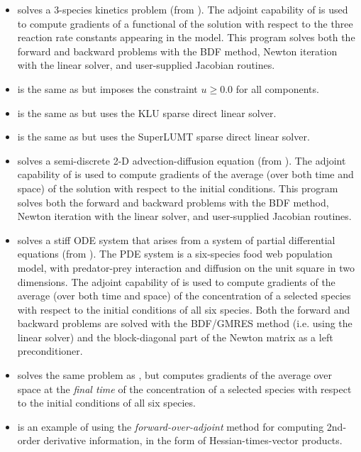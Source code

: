 \begin{itemize}
\item {}
  solves a 3-species kinetics problem (from ).
  \newline
  The adjoint capability of {\cvodes} is used to compute gradients
  of a functional of the solution with respect to the three
  reaction rate constants appearing in the model.
  This program solves both the forward and backward problems with the BDF method, 
  Newton iteration with the {\cvdense} linear solver, and user-supplied    
  Jacobian routines.
\item {}
  is the same as  but imposes the constraint
  $u \geq 0.0$ for all components.
\item {}
  is the same as  but uses the KLU sparse direct linear solver.
\item {}
  is the same as  but uses the SuperLUMT sparse direct linear solver.
\item {}
  solves a semi-discrete 2-D advection-diffusion equation (from ).
  \newline
  The adjoint capability of {\cvodes} is used to compute gradients
  of the average (over both time and space) of the solution with respect to
  the initial conditions.
  This program solves both the forward and backward problems with the BDF method, 
  Newton iteration with the {\cvband} linear solver, and user-supplied     
  Jacobian routines.
\item {}
  solves a stiff ODE system that arises from a system of partial differential
  equations (from ).  The PDE system is a six-species
  food web population model, with predator-prey interaction and diffusion 
  on the unit square in two dimensions.
  \newline
  The adjoint capability of {\cvodes} is used to compute gradients of the
  average (over both time and space) of the concentration of a selected species
  with respect to the initial conditions of all six species.
  Both the forward and backward problems are solved with the BDF/GMRES method 
  (i.e. using the {\cvspgmr} linear solver) and the block-diagonal part of the  
  Newton matrix as a left preconditioner.
\item {}
  solves the same problem as , but computes gradients of the
  average over space at the {\em final time} of the concentration of a selected species
  with respect to the initial conditions of all six species.


\item {}
  is an example of using the {\em forward-over-adjoint} method for
  computing 2nd-order derivative information, in the form of Hessian-times-vector
  products.

\end{itemize}

